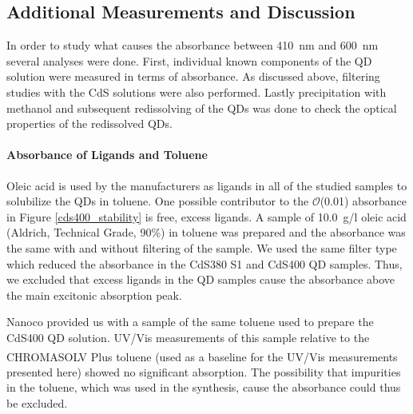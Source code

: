 \documentclass[cits]{JINST}
\begin{document}
\subsection{Additional Measurements and Discussion}
\label{discussion_sec}
In order to study what causes the absorbance between 410~nm and 600~nm several analyses were done. First, individual known components of the QD solution were measured in terms of absorbance. As discussed above, filtering studies with the CdS solutions were also performed. Lastly precipitation with methanol and subsequent redissolving of the QDs was done to check the optical properties of the redissolved QDs. 

\paragraph{Absorbance of Ligands and Toluene}
Oleic acid is used by the manufacturers as ligands in all of the studied samples to solubilize the QDs in toluene. One possible contributor to the $\mathcal{O}$(0.01) absorbance in Figure \ref{cds400_stability} is free, excess ligands. A sample of 10.0~g/l oleic acid (Aldrich, Technical Grade, 90\%) in toluene was prepared and the absorbance was the same with and without filtering of the sample. We used the same filter type which reduced the absorbance in the CdS380 S1 and CdS400 QD samples. Thus, we excluded that excess ligands in the QD samples cause the absorbance above the main excitonic absorption peak. 

Nanoco provided us with a sample of the same toluene used to prepare the CdS400 QD solution. UV/Vis measurements of this sample relative to the CHROMASOLV\textsuperscript{\textregistered} Plus toluene (used as a baseline for the UV/Vis measurements presented here) showed no significant absorption. The possibility that impurities in the toluene, which was used in the synthesis, cause the absorbance could thus be excluded.  
\end{document}
